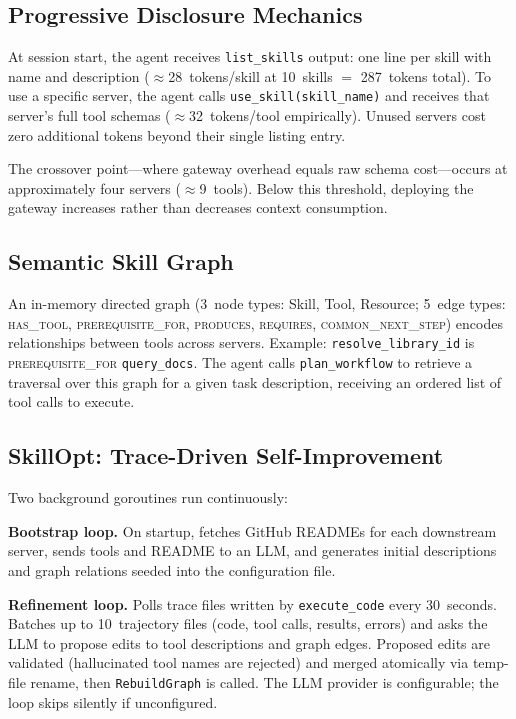\documentclass[11pt,a4paper]{article}
\begin{document}
\subsection{Progressive Disclosure Mechanics}

At session start, the agent receives \texttt{list\_skills} output: one line per skill
with name and description ($\approx$28~tokens/skill at 10~skills $=$ 287~tokens
total). To use a specific server, the agent calls \texttt{use\_skill(skill\_name)} and
receives that server's full tool schemas ($\approx$32~tokens/tool empirically). Unused
servers cost zero additional tokens beyond their single listing entry.

The crossover point---where gateway overhead equals raw schema cost---occurs at
approximately four servers ($\approx$9~tools). Below this threshold, deploying the
gateway increases rather than decreases context consumption.

\subsection{Semantic Skill Graph}

An in-memory directed graph (3~node types: Skill, Tool, Resource; 5~edge types:
\textsc{has\_tool}, \textsc{prerequisite\_for}, \textsc{produces}, \textsc{requires},
\textsc{common\_next\_step}) encodes relationships between tools across servers.
Example: \texttt{resolve\_library\_id} is \textsc{prerequisite\_for} \texttt{query\_docs}.
The agent calls \texttt{plan\_workflow} to retrieve a traversal over this graph for a
given task description, receiving an ordered list of tool calls to execute.

\subsection{SkillOpt: Trace-Driven Self-Improvement}

Two background goroutines run continuously:

\textbf{Bootstrap loop.} On startup, fetches GitHub READMEs for each downstream
server, sends tools and README to an LLM, and generates initial descriptions and graph
relations seeded into the configuration file.

\textbf{Refinement loop.} Polls trace files written by \texttt{execute\_code} every
30~seconds. Batches up to 10~trajectory files (code, tool calls, results, errors) and
asks the LLM to propose edits to tool descriptions and graph edges. Proposed edits are
validated (hallucinated tool names are rejected) and merged atomically via temp-file
rename, then \texttt{RebuildGraph} is called. The LLM provider is configurable;
the loop skips silently if unconfigured.
\end{document}
